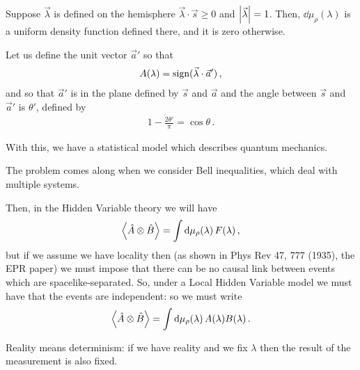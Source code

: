 \documentclass[main.tex]{subfiles}
\begin{document}
Suppose \(\vec{\lambda}\) is defined on the hemisphere \(\vec{\lambda} \cdot \vec{s} \geq 0 \) and \(\abs{\vec{\lambda}} =1\).
Then, \(\dd{\mu_{\rho }(\lambda )}\) is a uniform density function defined there, and it is zero otherwise. 

Let us define the unit vector \(\vec{a}'\) so that 
%
\begin{align}
A(\lambda ) = \text{sign}(\vec{\lambda } \cdot \vec{a}')
\,,
\end{align}
%
and so that \(\vec{a}'\) is in the plane defined by \(\vec{s}\) and \(\vec{a} \) and the angle between \(\vec{s}\) and \(\vec{a}'\) is \(\theta'\), defined by 
%
\begin{align}
1 - \frac{2 \theta'}{\pi } = \cos  \theta 
\,.
\end{align}

With this, we have a statistical model which describes quantum mechanics. 

The problem comes along when we consider Bell inequalities, which deal with multiple systems. 

Then, in the Hidden Variable theory we will have 
%
\begin{align}
\expval{\hat{A} \otimes \hat{B}} = \int \dd{\mu_{\rho } (\lambda )} F(\lambda )
\,,
\end{align}
%
but if we assume we have locality then (as shown in Phys Rev 47, 777 (1935), the EPR paper) we must impose that there can be no causal link between events which are spacelike-separated. 
So, under a Local Hidden Variable model we must have that the events are independent: so we must write 
%
\begin{align}
\expval{\hat{A} \otimes \hat{B}} = \int \dd{\mu_{\rho } (\lambda )} A(\lambda ) B(\lambda )
\,.
\end{align}

Reality means determinism: if we have reality and we fix \(\lambda \) then the result of the measurement is also fixed. 
\end{document}

